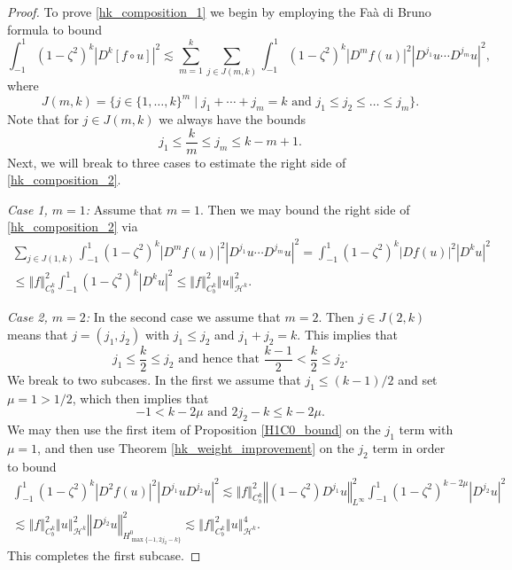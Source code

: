 \documentclass[11pt,reqno]{amsart}
\numberwithin{equation}{section}
\providecommand{\abs}[1]{\left\vert#1\right\vert}
\providecommand{\norm}[1]{\left\Vert#1\right\Vert}
\def\ls{\lesssim}
\providecommand{\abs}[1]{\left\vert#1\right\vert}
\providecommand{\norm}[1]{\left\Vert#1\right\Vert}
\def\ls{\lesssim}
\def\h{\mathcal{H}}
\def\st{\;\vert\;}
\begin{document}
\begin{proof}
To prove \eqref{hk_composition_1} we begin by employing the Fa\`a di Bruno formula to bound
\begin{equation}\label{hk_composition_2}
 \int_{-1}^1 (1-\zeta^2)^k \abs{ D^k  [ f\circ u ] }^2 \ls \sum_{m=1}^k \sum_{j \in J(m,k)} \int_{-1}^1 (1-\zeta^2)^k \abs{D^mf(u)}^2 \abs{D^{j_1} u \cdots D^{j_m} u }^2,
\end{equation}
where 
\begin{equation}
 J(m,k) = \{j \in \{1,\dotsc,k\}^m \st j_1 +\cdots + j_m = k \text{ and } j_1 \le j_2 \le \dotsc \le j_m\}.
\end{equation}
Note that for $j \in J(m,k)$ we always have the bounds 
\begin{equation}\label{hk_composition_3}
 j_1 \le \frac{k}{m} \le j_m \le k -  m+1.
\end{equation}
Next, we will break to three cases to estimate the right side of \eqref{hk_composition_2}.  

\emph{Case 1,  $m=1$:}   Assume that $m=1$.  Then we may bound the right side of \eqref{hk_composition_2} via 
\begin{multline}\label{hk_composition_3_5}
 \sum_{j \in J(1,k)} \int_{-1}^1 (1-\zeta^2)^k \abs{D^mf(u)}^2 \abs{D^{j_1} u \cdots D^{j_m} u }^2 = \int_{-1}^1 (1-\zeta^2)^k \abs{Df(u)}^2 \abs{D^{k} u}^2 \\
 \le \norm{f}_{C^k_b}^2 \int_{-1}^1 (1-\zeta^2)^k \abs{D^{k} u}^2 \le \norm{f}_{C^k_b}^2 \norm{u}_{\h^k}^2.
\end{multline}


\emph{Case 2,  $m=2$:} In the second case we assume that $m=2$.  Then $j \in J(2,k)$ means that $j=(j_1,j_2)$ with $j_1 \le j_2$ and $j_1 + j_2 =k$.  This implies that 
\begin{equation}
 j_1 \le \frac{k}{2} \le j_2 \text{ and hence that } \frac{k-1}{2} < \frac{k}{2} \le j_2.
\end{equation}
We break to two subcases.  In the first we assume that $j_1 \le (k-1)/2$ and set $\mu = 1 > 1/2$, which then implies that    
\begin{equation}
 -1 < k -2\mu \text{ and } 2j_2 -k \le  k-2\mu.
\end{equation}
We may then use the first item of Proposition \ref{H1C0_bound} on the $j_1$ term with $\mu=1$, and then use  Theorem \ref{hk_weight_improvement} on the $j_2$ term in order to bound  
\begin{multline}\label{hk_composition_4}
 \int_{-1}^1 (1-\zeta^2)^k \abs{D^2 f(u)}^2 \abs{D^{j_1} u  D^{j_2} u }^2 \ls \norm{f}_{C^k_b}^2 \norm{(1-\zeta^2) D^{j_1} u}_{L^\infty}^2   \int_{-1}^1 (1-\zeta^2)^{k-2\mu}   \abs{D^{j_2} u }^2  \\
 \ls  \norm{f}_{C^k_b}^2 \norm{u}_{\h^k}^2 \norm{D^{j_2} u}_{H^0_{\max\{-1,2 j_2 -k\}}}^2  \ls  \norm{f}_{C^k_b}^2 \norm{u}_{\h^k}^4.
\end{multline}
This completes the first subcase.


\end{proof}
\end{document}
